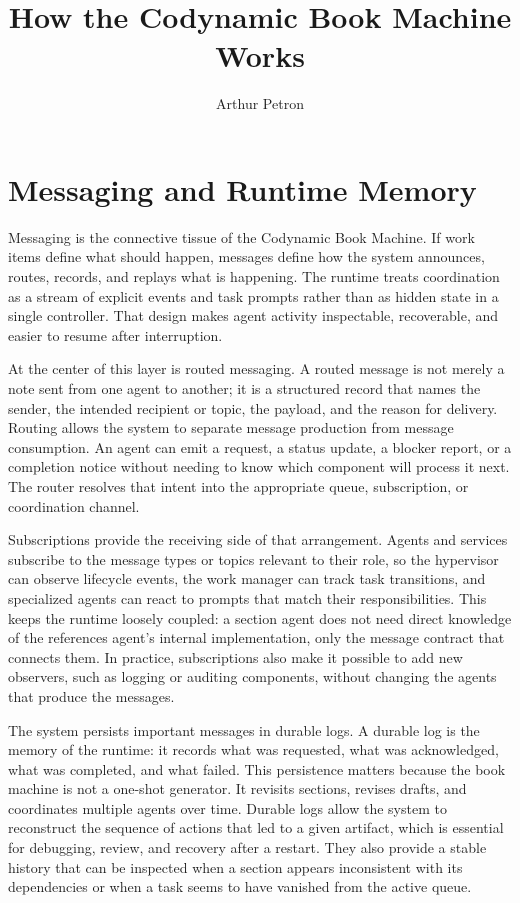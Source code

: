 \documentclass[11pt]{article}
\title{How the Codynamic Book Machine Works}
\author{Arthur Petron}
\begin{document}
\section*{Messaging and Runtime Memory}

Messaging is the connective tissue of the Codynamic Book Machine. If work items define what should happen, messages define how the system announces, routes, records, and replays what is happening. The runtime treats coordination as a stream of explicit events and task prompts rather than as hidden state in a single controller. That design makes agent activity inspectable, recoverable, and easier to resume after interruption.

At the center of this layer is routed messaging. A routed message is not merely a note sent from one agent to another; it is a structured record that names the sender, the intended recipient or topic, the payload, and the reason for delivery. Routing allows the system to separate message production from message consumption. An agent can emit a request, a status update, a blocker report, or a completion notice without needing to know which component will process it next. The router resolves that intent into the appropriate queue, subscription, or coordination channel.

Subscriptions provide the receiving side of that arrangement. Agents and services subscribe to the message types or topics relevant to their role, so the hypervisor can observe lifecycle events, the work manager can track task transitions, and specialized agents can react to prompts that match their responsibilities. This keeps the runtime loosely coupled: a section agent does not need direct knowledge of the references agent's internal implementation, only the message contract that connects them. In practice, subscriptions also make it possible to add new observers, such as logging or auditing components, without changing the agents that produce the messages.

The system persists important messages in durable logs. A durable log is the memory of the runtime: it records what was requested, what was acknowledged, what was completed, and what failed. This persistence matters because the book machine is not a one-shot generator. It revisits sections, revises drafts, and coordinates multiple agents over time. Durable logs allow the system to reconstruct the sequence of actions that led to a given artifact, which is essential for debugging, review, and recovery after a restart. They also provide a stable history that can be inspected when a section appears inconsistent with its dependencies or when a task seems to have vanished from the active queue.
\end{document}
